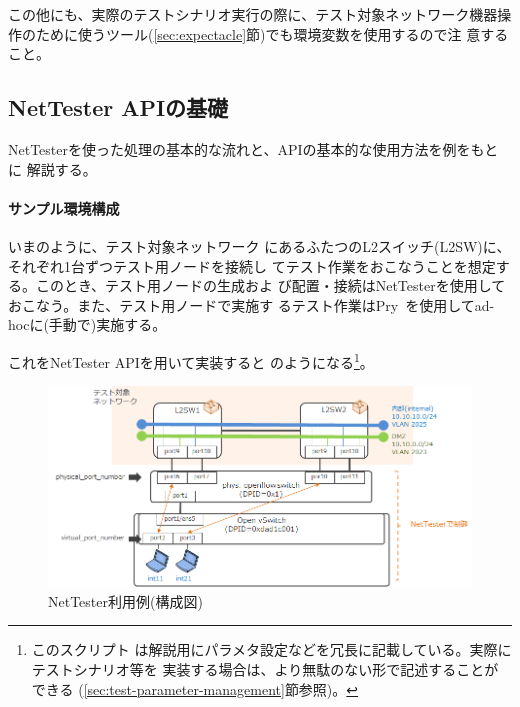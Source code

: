 この他にも、実際のテストシナリオ実行の際に、テスト対象ネットワーク機器操
作のために使うツール(\ref{sec:expectacle}節)でも環境変数を使用するので注
意すること。

  \subsection{NetTester APIの基礎}
  \label{sec:nettester-api-basics}

NetTesterを使った処理の基本的な流れと、APIの基本的な使用方法を例をもとに
解説する。

\paragraph{サンプル環境構成}

いまのように、テスト対象ネットワーク
にあるふたつのL2スイッチ(L2SW)に、それぞれ1台ずつテスト用ノードを接続し
てテスト作業をおこなうことを想定する。このとき、テスト用ノードの生成およ
び配置・接続はNetTesterを使用しておこなう。また、テスト用ノードで実施す
るテスト作業はPry~\cite{pry}を使用してad-hocに(手動で)実施する。

これをNetTester APIを用いて実装すると
のようになる\footnote{このスクリプト
は解説用にパラメタ設定などを冗長に記載している。実際にテストシナリオ等を
実装する場合は、より無駄のない形で記述することができる
(\ref{sec:test-parameter-management}節参照)。}。

\begin{figure}[h]
 \centering
 \includegraphics[scale=0.75]{img/nettester-basic-example.png}
 \caption{NetTester利用例(構成図)}
 \label{fig:nettester-basic-example}
\end{figure}

